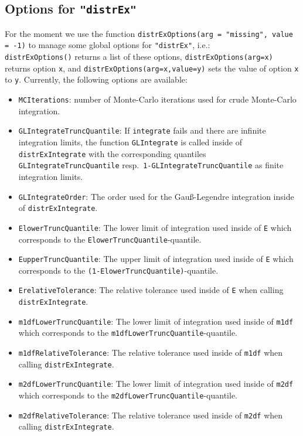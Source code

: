 \documentclass[11pt]{article}
\newcommand{\code}[1]{{\tt #1}}
\newcommand{\pkg}[1]{{\tt "#1"}}
\begin{document}
\subsection[Options for distrEx]{Options for \pkg{distrEx}} \label{distrExoptions}
For the moment we use the function \code{distrExOptions(arg = "missing", value = -1)} to manage some global options for
\pkg{distrEx}, i.e.:\\
\code{distrExOptions()} returns a list of these options,
\code{distrExOptions(arg=x)} returns option \code{x}, and
\code{distrExOptions(arg=x,value=y)} sets the value of option \code{x} to {\tt y}.
Currently, the following options are available:
\begin{itemize}
  \item \code{MCIterations}: number of Monte-Carlo iterations used for crude
          Monte-Carlo integration.
  \item \code{GLIntegrateTruncQuantile}: If \code{integrate} fails and there are
          infinite integration limits, the function \code{GLIntegrate} is
          called inside of \code{distrExIntegrate} with the corresponding
          quantiles  \code{GLIntegrateTruncQuantile} resp.\
          \code{1-GLIntegrateTruncQuantile} as finite integration limits.
  \item \code{GLIntegrateOrder}: The order used for the Gau{\ss{}}-Legendre
          integration inside of \code{distrExIntegrate}.
  \item \code{ElowerTruncQuantile}: The lower limit of integration used inside of
           \code{E} which corresponds to the \code{ElowerTruncQuantile}-quantile.
  \item \code{EupperTruncQuantile}: The upper limit of integration used inside of
           \code{E} which corresponds to the
          \code{(1-ElowerTruncQuantile)}-quantile.
  \item \code{ErelativeTolerance}: The relative tolerance used inside of \code{E} when
          calling \code{distrExIntegrate}.
  \item \code{m1dfLowerTruncQuantile}: The lower limit of integration used inside
           of \code{m1df} which corresponds to the
          \code{m1dfLowerTruncQuantile}-quantile.
  \item \code{m1dfRelativeTolerance}: The relative tolerance used inside of
          \code{m1df} when calling \code{distrExIntegrate}.
  \item \code{m2dfLowerTruncQuantile}: The lower limit of integration used inside
           of \code{m2df} which corresponds to the
          \code{m2dfLowerTruncQuantile}-quantile.
  \item \code{m2dfRelativeTolerance}: The relative tolerance used inside of
          \code{m2df} when calling \code{distrExIntegrate}.
\end{itemize}
\end{document}
